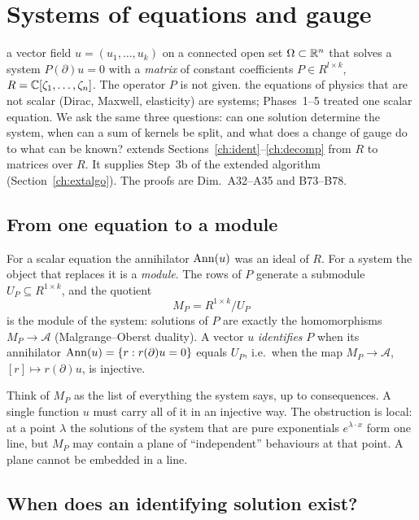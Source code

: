 \section{Systems of equations and gauge}\label{ch:systems}
\sectionbrief
{a vector field $u=(u_1,\dots,u_k)$ on a connected open set $\Omega\subset\mathbb{R}^n$ that solves a system $P(\partial)u=0$ with a \emph{matrix} of constant coefficients $P\in R^{l\times k}$, $R=\mathbb{C}[\zeta_1,\dots,\zeta_n]$. The operator $P$ is not given.}
{the equations of physics that are not scalar (Dirac, Maxwell, elasticity) are systems; Phases~1--5 treated one scalar equation. We ask the same three questions: can one solution determine the system, when can a sum of kernels be split, and what does a change of gauge do to what can be known?}
{extends Sections~\ref{ch:ident}--\ref{ch:decomp} from $R$ to matrices over $R$. It supplies Step~3b of the extended algorithm (Section~\ref{ch:extalgo}). The proofs are Dim.~A32--A35 and B73--B78.}

\subsection{From one equation to a module}

For a scalar equation the annihilator $\operatorname{Ann}(u)$ was an ideal of $R$. For a system the object that replaces it is a \emph{module}. The rows of $P$ generate a submodule $U_P\subseteq R^{1\times k}$, and the quotient
\[
M_P=R^{1\times k}/U_P
\]
is the module of the system: solutions of $P$ are exactly the homomorphisms $M_P\to\mathcal A$ (Malgrange--Oberst duality). A vector $u$ \emph{identifies} $P$ when its annihilator $\operatorname{Ann}(u)=\{r:r(\partial)u=0\}$ equals $U_P$, i.e.\ when the map $M_P\to\mathcal A$, $[r]\mapsto r(\partial)u$, is injective.

\begin{intuition}
Think of $M_P$ as the list of everything the system says, up to consequences. A single function $u$ must carry all of it in an injective way. The obstruction is local: at a point $\lambda$ the solutions of the system that are pure exponentials $e^{\lambda\cdot x}$ form one line, but $M_P$ may contain a plane of ``independent'' behaviours at that point. A plane cannot be embedded in a line.
\end{intuition}

\subsection{When does an identifying solution exist?}

